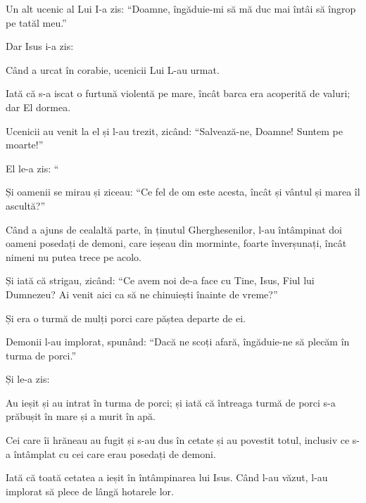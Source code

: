 {\par }{\PP {}Un alt ucenic al Lui I-a zis: “Doamne, îngăduie-mi să mă duc mai întâi să îngrop pe tatăl meu.”


\par }{\PP {}Dar Isus i-a zis:
{}


\par }{\PP {}Când a urcat în corabie, ucenicii Lui L-au urmat.

Iată că s-a iscat o furtună violentă pe mare, încât barca era acoperită de valuri; dar El dormea.

Ucenicii au venit la el și l-au trezit, zicând: “Salvează-ne, Doamne! Suntem pe moarte!”


\par }{\PP {}El le-a zis: “{}


\par }{\PP {}Și oamenii se mirau și ziceau: “Ce fel de om este acesta, încât și vântul și marea îl ascultă?”


\par }{\PP {}Când a ajuns de cealaltă parte, în ținutul Gherghesenilor, l-au întâmpinat doi oameni posedați de demoni, care ieșeau din morminte, foarte înverșunați, încât nimeni nu putea trece pe acolo.

Și iată că strigau, zicând: “Ce avem noi de-a face cu Tine, Isus, Fiul lui Dumnezeu? Ai venit aici ca să ne chinuiești înainte de vreme?”

Și era o turmă de mulți porci care păștea departe de ei.

Demonii l-au implorat, spunând: “Dacă ne scoți afară, îngăduie-ne să plecăm în turma de porci.”


\par }{\PP {}Și le-a zis:
{}

\par }{\PP Au ieșit și au intrat în turma de porci; și iată că întreaga turmă de porci s-a prăbușit în mare și a murit în apă.

Cei care îi hrăneau au fugit și s-au dus în cetate și au povestit totul, inclusiv ce s-a întâmplat cu cei care erau posedați de demoni.

Iată că toată cetatea a ieșit în întâmpinarea lui Isus. Când l-au văzut, l-au implorat să plece de lângă hotarele lor.



}
